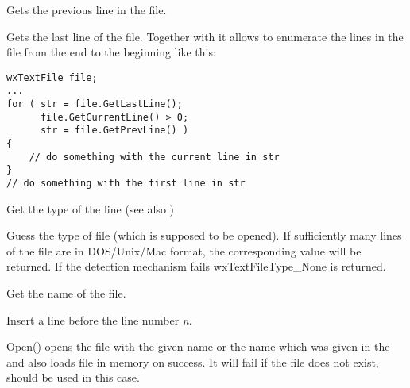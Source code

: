 Gets the previous line in the file.

\label{wxtextfilegetlastline}


Gets the last line of the file. Together with 
 it allows to enumerate the lines
in the file from the end to the beginning like this:

\begin{verbatim}
wxTextFile file;
...
for ( str = file.GetLastLine();
      file.GetCurrentLine() > 0;
      str = file.GetPrevLine() )
{
    // do something with the current line in str
}
// do something with the first line in str
\end{verbatim}

\label{wxtextfilegetlinetype}


Get the type of the line (see also )

\label{wxtextfileguesstype}


Guess the type of file (which is supposed to be opened). If sufficiently
many lines of the file are in DOS/Unix/Mac format, the corresponding value will
be returned. If the detection mechanism fails wxTextFileType\_None is returned.

\label{wxtextfilegetname}


Get the name of the file.

\label{wxtextfileinsertline}


Insert a line before the line number {\it n}.

\label{wxtextfileopen}



Open() opens the file with the given name or the name which was given in the
 and also loads file in memory on
success. It will fail if the file does not exist, 
 should be used in this case.

